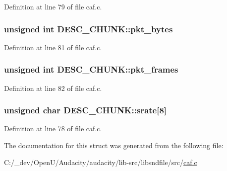 Definition at line 79 of file caf.\+c.

\subsubsection[{\texorpdfstring{pkt\+\_\+bytes}{pkt_bytes}}]{\setlength{\rightskip}{0pt plus 5cm}unsigned {\bf int} D\+E\+S\+C\+\_\+\+C\+H\+U\+N\+K\+::pkt\+\_\+bytes}\hypertarget{struct_d_e_s_c___c_h_u_n_k_a757e6726426c6d057dc4477ee799ce1d}{}\label{struct_d_e_s_c___c_h_u_n_k_a757e6726426c6d057dc4477ee799ce1d}


Definition at line 81 of file caf.\+c.

\subsubsection[{\texorpdfstring{pkt\+\_\+frames}{pkt_frames}}]{\setlength{\rightskip}{0pt plus 5cm}unsigned {\bf int} D\+E\+S\+C\+\_\+\+C\+H\+U\+N\+K\+::pkt\+\_\+frames}\hypertarget{struct_d_e_s_c___c_h_u_n_k_a9fe0397dae15adae8e14e098a908ce4f}{}\label{struct_d_e_s_c___c_h_u_n_k_a9fe0397dae15adae8e14e098a908ce4f}


Definition at line 82 of file caf.\+c.

\subsubsection[{\texorpdfstring{srate}{srate}}]{\setlength{\rightskip}{0pt plus 5cm}unsigned char D\+E\+S\+C\+\_\+\+C\+H\+U\+N\+K\+::srate\mbox{[}8\mbox{]}}\hypertarget{struct_d_e_s_c___c_h_u_n_k_ad90f5476bc9ef74c2cc94d553e32b7b6}{}\label{struct_d_e_s_c___c_h_u_n_k_ad90f5476bc9ef74c2cc94d553e32b7b6}


Definition at line 78 of file caf.\+c.



The documentation for this struct was generated from the following file\+:\begin{DoxyCompactItemize}
\item 
C\+:/\+\_\+dev/\+Open\+U/\+Audacity/audacity/lib-\/src/libsndfile/src/\hyperlink{caf_8c}{caf.\+c}\end{DoxyCompactItemize}
